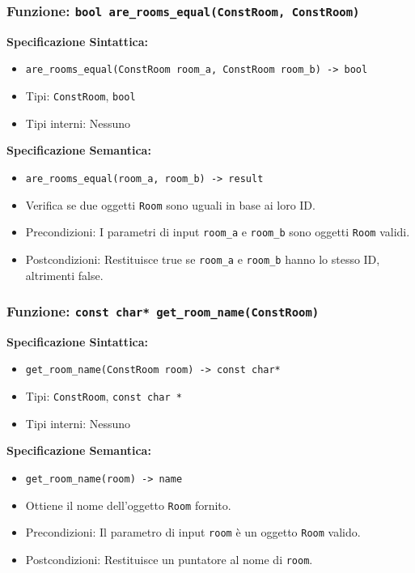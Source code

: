 \documentclass[11pt]{scrartcl} %
\begin{document}
\subsubsection{Funzione: \texttt{bool are\_rooms\_equal(ConstRoom, ConstRoom)}}

\textbf{Specificazione Sintattica:}
\begin{itemize}
	\item \texttt{are\_rooms\_equal(ConstRoom room\_a, ConstRoom room\_b) -> bool}
	\item Tipi: \texttt{ConstRoom}, \texttt{bool}
	\item Tipi interni: Nessuno
\end{itemize}

\textbf{Specificazione Semantica:}
\begin{itemize}
	\item \texttt{are\_rooms\_equal(room\_a, room\_b) -> result}
	\item Verifica se due oggetti \texttt{Room} sono uguali in base ai loro ID.
	\item Precondizioni: I parametri di input \texttt{room\_a} e \texttt{room\_b} sono oggetti \texttt{Room} validi.
	\item Postcondizioni: Restituisce true se \texttt{room\_a} e \texttt{room\_b} hanno lo stesso ID, altrimenti false.
\end{itemize}

\subsubsection{Funzione: \texttt{const char* get\_room\_name(ConstRoom)}}

\textbf{Specificazione Sintattica:}
\begin{itemize}
	\item \texttt{get\_room\_name(ConstRoom room) -> const char*}
	\item Tipi: \texttt{ConstRoom}, \texttt{const char *}
	\item Tipi interni: Nessuno
\end{itemize}

\textbf{Specificazione Semantica:}
\begin{itemize}
	\item \texttt{get\_room\_name(room) -> name}
	\item Ottiene il nome dell'oggetto \texttt{Room} fornito.
	\item Precondizioni: Il parametro di input \texttt{room} è un oggetto \texttt{Room} valido.
	\item Postcondizioni: Restituisce un puntatore al nome di \texttt{room}.
\end{itemize}
\end{document}
